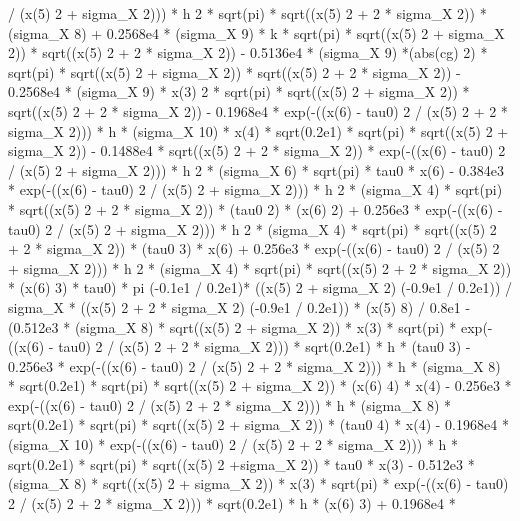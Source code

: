 \begin{maplegroup}
/ (x(5)  2 + sigma\_X  2))) * h  2 * sqrt(pi) * sqrt((x(5)  2 + 2 * sigma\_X  2)) * (sigma\_X  8) + 0.2568e4 * (sigma\_X  9) * k * sqrt(pi) * sqrt((x(5)  2 + sigma\_X  2)) * sqrt((x(5)  2 + 2 * sigma\_X  2)) - 0.5136e4 * (sigma\_X  9) *(abs(cg)  2) * sqrt(pi) * sqrt((x(5)  2 + sigma\_X  2)) * sqrt((x(5)  2 + 2 * sigma\_X  2)) - 0.2568e4 * (sigma\_X  9) * x(3)  2 * sqrt(pi) * sqrt((x(5)  2 + sigma\_X  2)) * sqrt((x(5)  2 + 2 * sigma\_X  2)) - 0.1968e4 * exp(-((x(6) - tau0)  2 / (x(5)  2 + 2 * sigma\_X  2))) * h * (sigma\_X  10) * x(4) * sqrt(0.2e1) * sqrt(pi) * sqrt((x(5)  2 + sigma\_X  2)) - 0.1488e4 * sqrt((x(5)  2 + 2 * sigma\_X  2)) * exp(-((x(6) - tau0)  2 / (x(5)  2 + sigma\_X  2))) * h  2 * (sigma\_X  6) * sqrt(pi) * tau0 * x(6) - 0.384e3 * exp(-((x(6) - tau0)  2 / (x(5)  2 + sigma\_X  2))) * h  2 * (sigma\_X  4) * sqrt(pi) * sqrt((x(5)  2 + 2 * sigma\_X  2)) * (tau0  2) * (x(6)  2) + 0.256e3 * exp(-((x(6) - tau0)  2 / (x(5)  2 + sigma\_X  2))) * h  2 * (sigma\_X 4) * sqrt(pi) * sqrt((x(5)  2 + 2 * sigma\_X  2)) * (tau0  3) * x(6) + 0.256e3 * exp(-((x(6) - tau0)  2 / (x(5)  2 + sigma\_X  2))) * h  2 * (sigma\_X  4) * sqrt(pi) * sqrt((x(5)  2 + 2 * sigma\_X  2)) * (x(6)  3) * tau0) * pi  (-0.1e1 / 0.2e1)* ((x(5)  2 + sigma\_X  2)  (-0.9e1 / 0.2e1)) / sigma\_X * ((x(5)  2 + 2 * sigma\_X  2)  (-0.9e1 / 0.2e1)) * (x(5)  8) / 0.8e1 - (0.512e3 * (sigma\_X  8) * sqrt((x(5)  2 + sigma\_X  2)) * x(3) * sqrt(pi) * exp(-((x(6) - tau0)  2 / (x(5)  2 + 2 * sigma\_X  2))) * sqrt(0.2e1) * h * (tau0  3) - 0.256e3 * exp(-((x(6) - tau0)  2 / (x(5)  2 + 2 * sigma\_X  2))) * h * (sigma\_X  8) * sqrt(0.2e1) * sqrt(pi) * sqrt((x(5)  2 + sigma\_X  2)) * (x(6)  4) * x(4) - 0.256e3 * exp(-((x(6) - tau0)  2 / (x(5) 2 + 2 * sigma\_X  2))) * h * (sigma\_X  8) * sqrt(0.2e1) * sqrt(pi) * sqrt((x(5)  2 + sigma\_X  2)) * (tau0  4) * x(4) - 0.1968e4 * (sigma\_X  10) * exp(-((x(6) - tau0)  2 / (x(5)  2 + 2 * sigma\_X  2))) * h * sqrt(0.2e1) * sqrt(pi) * sqrt((x(5)  2 +sigma\_X  2)) * tau0 * x(3) - 0.512e3 * (sigma\_X  8) * sqrt((x(5)  2 + sigma\_X  2)) * x(3) * sqrt(pi) * exp(-((x(6) - tau0)  2 / (x(5)  2 + 2 * sigma\_X  2))) * sqrt(0.2e1) * h * (x(6)  3) + 0.1968e4 * 
\end{maplegroup}
